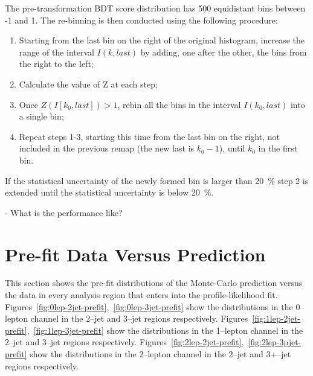 
The pre-transformation BDT score distribution has 500 equidistant bins between
-1 and 1. The re-binning is then conducted using the following procedure:
\begin{enumerate}
\item Starting from the last bin on the right of the original histogram,
  increase the range of the interval $I(k, last)$ by adding, one after the other,
  the bins from the right to the left;
\item Calculate the value of Z at each step;
\item Once $Z(I[k_{0}, last]) > 1$, rebin all the bins in the interval $I(k_{0},
  last)$ into a single bin;
\item Repeat steps 1-3, starting this time from the last bin on the right, not
  included in the previous remap (the new last is $k_{0}-1$), until $k_{0}$ in
  the first bin.
\end{enumerate}
If the statistical uncertainty of the newly formed bin is larger than 20~\% step
2 is extended until the statistical uncertainty is below 20~\%.

- What is the performance like?

\section{Pre-fit Data Versus Prediction}
\label{sec:prefit}

This section shows the pre-fit distributions of the Monte-Carlo prediction
versus the data in every analysis region that enters into the profile-likelihood
fit. Figures~\ref{fig:0lep-2jet-prefit},~\ref{fig:0lep-3jet-prefit} show the
distributions in the 0--lepton channel in the 2--jet and 3--jet regions
respectively. Figures~\ref{fig:1lep-2jet-prefit},~\ref{fig:1lep-3jet-prefit} show the
distributions in the 1--lepton channel in the 2--jet and 3--jet regions
respectively. Figures~\ref{fig:2lep-2jet-prefit},~\ref{fig:2lep-3pjet-prefit} show the
distributions in the 2--lepton channel in the 2--jet and 3+--jet regions
respectively.








